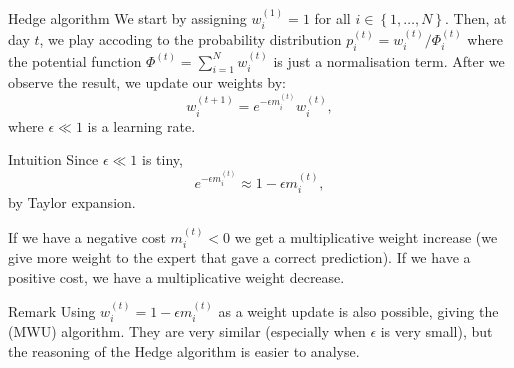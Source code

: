 \documentclass[a4paper]{article}
\begin{document}
\begin{parag}{Hedge algorithm}
    We start by assigning $w_i^{\left(1\right)} = 1$ for all $i \in \left\{1, \ldots, N\right\}$. Then, at day $t$, we play accoding to the probability distribution $p_i^{\left(t\right)} = w_i^{\left(t\right)} / \Phi_i^{\left(t\right)}$ where the potential function $\Phi^{\left(t\right)} = \sum_{i = 1}^{N} w_i^{\left(t\right)}$ is just a normalisation term. After we observe the result, we update our weights by: 
    \[w_i^{\left(t+1\right)} = e^{- \epsilon m_i^{\left(t\right)}} w_i^{\left(t\right)},\]
    where $\epsilon \ll 1$ is a learning rate. 

    \begin{subparag}{Intuition}
        Since $\epsilon \ll 1$ is tiny, 
        \[e^{- \epsilon m_i^{\left(t\right)}} \approx 1 - \epsilon m_i^{\left(t\right)},\]
        by Taylor expansion.

        If we have a negative cost $m_i^{\left(t\right)} < 0$ we get a multiplicative weight increase (we give more weight to the expert that gave a correct prediction). If we have a positive cost, we have a multiplicative weight decrease.
    \end{subparag}

    \begin{subparag}{Remark}
        Using $w_i^{\left(t\right)} = 1 - \epsilon m_i^{\left(t\right)}$ as a weight update is also possible, giving the  (MWU) algorithm. They are very similar (especially when $\epsilon$ is very small), but the reasoning of the Hedge algorithm is easier to analyse.
    \end{subparag}
\end{parag}
\end{document}
